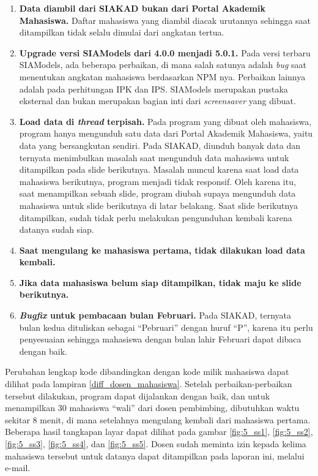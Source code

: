 \begin{enumerate}
	\item \textbf{Data diambil dari SIAKAD bukan dari Portal Akademik Mahasiswa.} Daftar mahasiswa yang diambil diacak urutannya sehingga saat ditampilkan tidak selalu dimulai dari angkatan tertua.
    \item \textbf{Upgrade versi SIAModels dari 4.0.0 menjadi 5.0.1.} Pada versi terbaru SIAModels, ada beberapa perbaikan, di mana salah satunya adalah \textit{bug} saat menentukan angkatan mahasiswa berdasarkan NPM nya. Perbaikan lainnya adalah pada perhitungan IPK dan IPS. SIAModels merupakan pustaka eksternal dan bukan merupakan bagian inti dari \textit{screensaver} yang dibuat.
    \item \textbf{Load data di \textit{thread} terpisah.} Pada program yang dibuat oleh mahasiswa, program hanya mengunduh satu data dari Portal Akademik Mahasiswa, yaitu data yang bersangkutan sendiri. Pada SIAKAD, diunduh banyak data dan ternyata menimbulkan masalah saat mengunduh data mahasiswa untuk ditampilkan pada slide berikutnya. Masalah muncul karena saat load data mahasiswa berikutnya, program menjadi tidak responsif. Oleh karena itu, saat menampilkan sebuah slide, program diubah supaya mengunduh data mahasiswa untuk slide berikutnya di latar belakang. Saat slide berikutnya ditampilkan, sudah tidak perlu melakukan pengunduhan kembali karena datanya sudah siap.
    \item \textbf{Saat mengulang ke mahasiswa pertama, tidak dilakukan load data kembali.}
    \item \textbf{Jika data mahasiswa belum siap ditampilkan, tidak maju ke slide berikutnya.}
    \item \textbf{\textit{Bugfix} untuk pembacaan bulan Februari.} Pada SIAKAD, ternyata bulan kedua dituliskan sebagai ``Pebruari'' dengan huruf ``P'', karena itu perlu penyesuaian sehingga mahasiswa dengan bulan lahir Februari dapat dibaca dengan baik.
\end{enumerate}

Perubahan lengkap kode dibandingkan dengan kode milik mahasiswa dapat dilihat pada lampiran \ref{diff_dosen_mahasiswa}.
Setelah perbaikan-perbaikan tersebut dilakukan, program dapat dijalankan dengan baik, dan untuk menampilkan 30 mahasiswa ``wali'' dari dosen pembimbing, dibutuhkan waktu sekitar 8 menit, di mana setelahnya mengulang kembali dari mahasiswa pertama. Beberapa hasil tangkapan layar dapat dilihat pada gambar \ref{fig:5_ss1}, \ref{fig:5_ss2}, \ref{fig:5_ss3}, \ref{fig:5_ss4}, dan \ref{fig:5_ss5}. Dosen sudah meminta izin kepada kelima mahasiswa tersebut untuk datanya dapat ditampilkan pada laporan ini, melalui e-mail.

